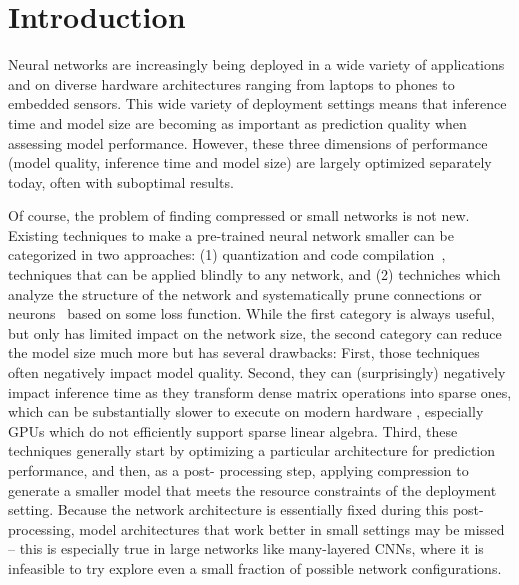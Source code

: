 
\section{Introduction}

Neural networks are increasingly being deployed in a wide variety  of
applications  and on diverse hardware architectures ranging from laptops to
phones to embedded sensors. This wide variety of deployment settings means
that inference time and model size are becoming as important as  prediction
quality when assessing model performance.  However, these three dimensions of
performance (model quality, inference time and model size)  are largely
optimized separately today, often with suboptimal results.

Of course, the problem of finding compressed or small networks is not new.
Existing techniques to make a pre-trained neural network smaller can be
categorized in two approaches: (1) quantization \cite{quant} and code
compilation~\cite{ma2016compilation}, techniques that can be applied blindly to
any network, and (2) techniches which analyze the structure of the network and
systematically prune connections or neurons~\cite{han2015deepcompression,Cun}
based on some loss function. While the first category is always useful, but only
has limited impact on the network size, the second category can reduce the model
size much more but has several drawbacks:   First, those techniques often
negatively impact model quality.  Second, they can (surprisingly) negatively
impact inference time as they transform dense matrix operations into sparse
ones, which can be substantially slower to execute on modern hardware
\cite{han2015deepcompression}, especially GPUs which do not efficiently support
sparse linear algebra.  Third, these techniques generally start by optimizing a
particular architecture for prediction performance, and then, as a post-
processing step, applying compression  to generate a smaller model that meets
the resource constraints of the deployment setting.  Because the network
architecture is essentially fixed during this post-processing,   model
architectures that work better in small settings may be missed -- this is
especially true in large networks like many-layered CNNs,  where it is
infeasible to try explore even a small fraction of possible network
configurations.


